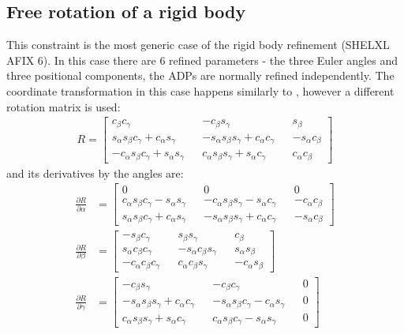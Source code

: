 \documentclass[11pt]{article}
\newcommand{\partialder}[2]{\frac{\partial #1}{\partial #2}}
\begin{document}
\subsection{Free rotation of a rigid body}
\label{sec:free:rotated:group}
This constraint is the most generic case of the rigid body refinement (SHELXL AFIX 6). In this case there are 6 refined parameters - the three Euler angles and three positional components, the ADPs are normally refined independently. The coordinate transformation in this case happens similarly to , however a different rotation matrix is used:
\begin{align}
R = \begin{bmatrix} \label{eq:erm}
   c_\beta c_\gamma && - c_\beta s_\gamma &&  s_\beta \\
   s_\alpha s_\beta c_\gamma +  c_\alpha s_\gamma && - s_\alpha s_\beta s_\gamma+ c_\alpha c_\gamma && - s_\alpha c_\beta \\
  - c_\alpha s_\beta c_\gamma+ s_\alpha s_\gamma &&  c_\alpha s_\beta s_\gamma+ s_\alpha c_\gamma &&  c_\alpha c_\beta
\end{bmatrix}
\end{align}
and its derivatives by the angles are:
\begin{align}
\partialder{R}{\alpha} &= \begin{bmatrix}
  0 && 0 && 0 \\
   c_\alpha s_\beta c_\gamma -  s_\alpha s_\gamma && - c_\alpha s_\beta s_\gamma- s_\alpha c_\gamma && - c_\alpha c_\beta \\
   s_\alpha s_\beta c_\gamma+ c_\alpha s_\gamma && - s_\alpha s_\beta s_\gamma+ c_\alpha c_\gamma && - s_\alpha c_\beta
\end{bmatrix}
\\
\partialder{R}{\beta} &= \begin{bmatrix}
  - s_\beta c_\gamma &&  s_\beta s_\gamma &&  c_\beta \\
   s_\alpha c_\beta c_\gamma && - s_\alpha c_\beta s_\gamma &&  s_\alpha s_\beta \\
  - c_\alpha c_\beta c_\gamma &&  c_\alpha c_\beta s_\gamma && - c_\alpha s_\beta
\end{bmatrix}
\\
\partialder{R}{\gamma} &= \begin{bmatrix}
  - c_\beta s_\gamma && - c_\beta c_\gamma && 0 \\
  - s_\alpha s_\beta s_\gamma +  c_\alpha c_\gamma && - s_\alpha s_\beta c_\gamma- c_\alpha s_\gamma && 0 \\
   c_\alpha s_\beta s_\gamma+ s_\alpha c_\gamma &&  c_\alpha s_\beta c_\gamma- s_\alpha s_\gamma && 0
\end{bmatrix}
\end{align}
\end{document}
